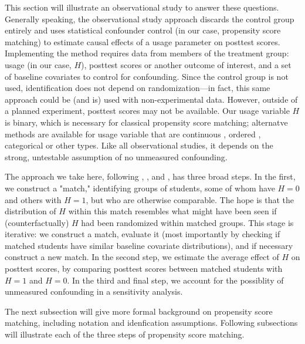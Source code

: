 \documentclass{article}\usepackage[]{graphicx}\usepackage[]{color}
\begin{document}
This section will illustrate an observational study to answer these
questions.
Generally speaking, the observational study approach discards the
control group entirely and uses statistical confounder control (in our
case, propensity score matching) to estimate causal effects of a usage parameter on posttest scores.
Implementing the method requires data from members of the treatment group: usage (in our case, $H$), posttest scores or another outcome of interest, and a set of baseline covariates to control for confounding.
Since the control group is not used, identification does not depend on randomization---in fact, this same approach could be (and is) used with non-experimental data.
However, outside of a planned experiment, posttest scores may not be available.
Our usage variable $H$ is binary, which is necessary for classical propensity score matching; alternatve methods are available for usage variable that are continuous \citep[e.g.][]{hirano2004propensity}, ordered \citep[e.g.][]{leon2005mixed}, categorical \citep[e.g.][]{lopez2017estimation} or other types.
Like all observational studies, it depends on the strong, untestable assumption of no unmeasured confounding.

The approach we take here, following \citet{rosenbaum2002observational},
 \citet{hansen2009b}, and \citet{ho:etal:2007}, has three broad steps.
In the first, we construct a "match," identifying groups of students, some of whom have $H=0$ and others with $H=1$, but who are otherwise comparable.
The hope is that the distribution of $H$ within this match resembles what might have been seen if (counterfactually) $H$ had been randomized within matched groups.
This stage is iterative: we construct a match, evaluate it (most importantly by checking if matched students have similar baseline covariate distributions), and if necessary construct a new match.
In the second step, we estimate the average effect of $H$ on posttest scores, by comparing posttest scores between matched students with $H=1$ and $H=0$.
In the third and final step, we account for the possiblity of unmeasured confounding in a sensitivity analysis.

The next subsection will give more formal background on propensity score matching, including notation and idenfication assumptions. Following subsections will illustrate each of the three steps of propensity score matching.
\end{document}
